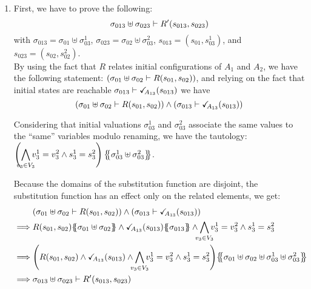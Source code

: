 \documentclass[runningheads]{llncs}
\begin{document}
\begin{enumerate}
\item First, we have to prove the following:
\[\sigma_{013} \uplus \sigma_{023} \vdash R'{\left(s_{013}, s_{023}\right)}\]
with $\sigma_{013} = \sigma_{01} \uplus \sigma_{03}^1$, $\sigma_{023} = \sigma_{02} \uplus \sigma_{03}^2$, $s_{013}=(s_{01},s_{03}^1)$, and $s_{023}=(s_{02},s_{02}^2)$.\\
By using the fact that $R$ relates initial configurations of  $A_1$ and $A_2$, we have  the following statement:
${\left(\sigma_{01} \uplus \sigma_{02} \vdash R{\left(s_{01}, s_{02}\right)}\right)}$,  and relying on the  fact that initial states are reachable $\sigma_{013} \vdash \checkmark_{\!\! A_{13}}{\left(s_{013}\right)}$ we have 
\[ {\left(\sigma_{01} \uplus \sigma_{02} \vdash R{\left(s_{01}, s_{02}\right)}\right)} \wedge 
{\left(\sigma_{013} \vdash \checkmark_{\!\! A_{13}}{\left(s_{013}\right)}\right)}\]

Considering that initial valuations $\sigma_{03}^1$ and $\sigma_{03}^2$ associate the same values to the ``same'' variables modulo renaming, we have the tautology:\\ $\left({\displaystyle \bigwedge_\subbox{v_3\in V_3} v^1_3=v^2_3\wedge s^1_3 = s^2_3}\right)\psubst{\sigma_{03}^1 \uplus \sigma_{03}^2 }$.

Because  the domains of the substitution function are disjoint, the substitution function has an effect only on the related elements,  we get:
\begin{align*}
& \mpar{\sigma_{01} \uplus \sigma_{02} \vdash R\mpar{s_{01}, s_{02}}} \wedge 
\mpar{\sigma_{013} \vdash \reach{A_{13}}\mpar{s_{013}}}\\
\implies & R\mpar{s_{01}, s_{02}}\psubst{ \sigma_{01} \uplus \sigma_{02}} \wedge \reach{A_{13}}\mpar{s_{013}} \psubst{\sigma_{013}} \land \bigwedge_\subbox{v_3\in V_3} v^1_3=v^2_3\wedge s^1_3 = s^2_3\\
\implies & \mpar{R\mpar{s_{01}, s_{02}} \wedge \reach{A_{13}}\mpar{s_{013}}  \wedge \bigwedge_\subbox{v_3\in V_3}  v^1_3=v^2_3\wedge s^1_3 = s^2_3} \psubst{ \sigma_{01} \uplus \sigma_{02} \uplus \sigma^1_{03}\uplus \sigma^2_{03} }\\
\implies & \sigma_{013} \uplus \sigma_{023} \vdash R'\mpar{s_{013}, s_{023}}
\end{align*}




\end{enumerate}
\end{document}
